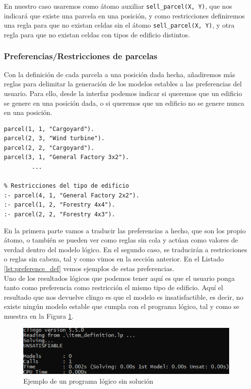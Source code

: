 En nuestro caso usaremos como átomo auxiliar \texttt{sell\_parcel(X, Y)}, que nos indicará que existe una parcela en una posición, y como restricciones definiremos una regla para que no existan celdas sin el átomo \texttt{sell\_parcel(X, Y)}, y otra regla para que no existan celdas con tipos de edificio distintos.

\subsubsection{Preferencias/Restricciones de parcelas}

Con la definición de cada parcela a una posición dada hecha, añadiremos más reglas para delimitar la generación de los modelos estables a las preferencias del usuario. Para ello, desde la interfaz podemos indicar si queremos que un edificio se genere en una posición dada, o si queremos que un edificio no se genere nunca en una posición. \\

\begin{lstlisting}[caption={Preferencias de parcelas},captionpos=b,label=lst:preference_def]
% Preferencia de colocacion de parcelas
parcel(1, 1, "Cargoyard").
parcel(2, 3, "Wind turbine").
parcel(2, 2, "Cargoyard").
parcel(3, 1, "General Factory 3x2").
        ...

% Restricciones del tipo de edificio
:- parcel(4, 1, "General Factory 2x2").
:- parcel(1, 2, "Forestry 4x4").
:- parcel(2, 2, "Forestry 4x3").
\end{lstlisting}

En la primera parte vamos a traducir las preferencias a hecho, que son los propio átomo, o también se pueden ver como reglas sin cola y actúan como valores de verdad dentro del modelo lógico. En el segundo caso, se traducirán a restricciones o reglas sin cabeza, tal y como vimos en la sección anterior. En el Listado \ref{lst:preference_def} vemos ejemplos de estas preferencias. \\

Uno de los resultados lógicos que podemos tener aquí es que el usuario ponga tanto como preferencia como restricción el mismo tipo de edificio. Aquí el resultado que nos devuelve clingo es que el modelo es insatisfactible, es decir, no existe ningún modelo estable que cumpla con el programa lógico, tal y como se muestra en la Figura \ref{fig:clingo-unsat}. \\

\begin{figure}[!h]
	\centering
	\includegraphics[width=\textwidth]{images/clingo-unsat}
	\caption{Ejemplo de un programa lógico sin solución}
	\label{fig:clingo-unsat}
\end{figure}

